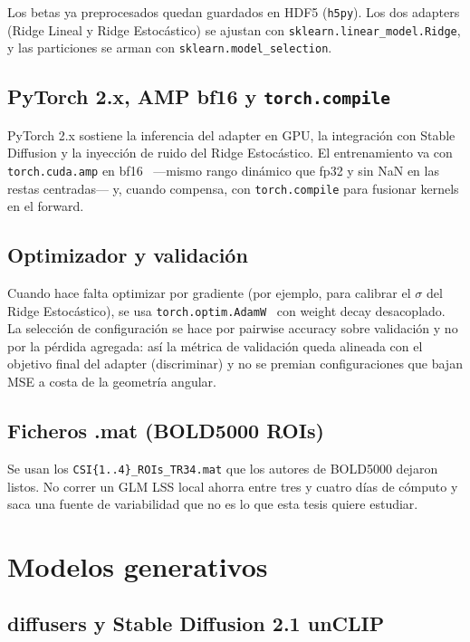 Los betas ya preprocesados quedan guardados en HDF5 (\texttt{h5py}). Los dos adapters (Ridge 
Lineal y Ridge Estocástico) se ajustan con \texttt{sklearn.linear\_model.Ridge}, y las 
particiones se arman con \texttt{sklearn.model\_selection}.

\subsection{PyTorch 2.x, AMP bf16 y \texttt{torch.compile}}

PyTorch 2.x sostiene la inferencia del adapter en GPU, la integración con Stable Diffusion y 
la inyección de ruido del Ridge Estocástico. El entrenamiento va con \texttt{torch.cuda.amp} 
en bf16~\cite{kobayashi2017bf16,micikevicius2018amp} ---mismo rango dinámico que fp32 y sin 
NaN en las restas centradas--- y, cuando compensa, con \texttt{torch.compile} para fusionar 
kernels en el forward.

\subsection{Optimizador y validación}

Cuando hace falta optimizar por gradiente (por ejemplo, para calibrar el $\sigma$ del Ridge 
Estocástico), se usa \texttt{torch.optim.AdamW}~\cite{loshchilov2019adamw} con weight 
decay desacoplado. La selección de configuración se hace por pairwise accuracy sobre validación
y no por la pérdida agregada: así la métrica de validación
queda alineada con el objetivo final del adapter (discriminar) y no se premian
configuraciones que bajan MSE a costa de la geometría angular.

\subsection{Ficheros .mat (BOLD5000 ROIs)}

Se usan los \texttt{CSI\{1..4\}\_ROIs\_TR34.mat} que los autores de BOLD5000 dejaron listos. 
No correr un GLM LSS local ahorra entre tres y cuatro días de cómputo y saca una fuente de 
variabilidad que no es lo que esta tesis quiere estudiar.

\section{Modelos generativos}

\subsection{diffusers y Stable Diffusion 2.1 unCLIP}

